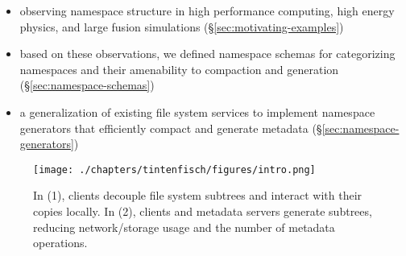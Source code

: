 \begin{itemize}
  \setlength\itemsep{-0.5em}

\item observing namespace structure in high performance computing, high energy
physics, and large fusion simulations (\S\ref{sec:motivating-examples})

\item based on these observations, we defined namespace schemas for
categorizing namespaces and their amenability to compaction and generation
(\S\ref{sec:namespace-schemas})

\item a generalization of existing file system services to implement namespace
generators that efficiently compact and generate metadata
(\S\ref{sec:namespace-generators}) \end{itemize}

\begin{figure}[t]
  \centering
  \texttt{[image: ./chapters/tintenfisch/figures/intro.png]}
  \caption{In (1), clients decouple file system subtrees and interact with
their copies locally. In (2), clients and metadata servers generate subtrees,
reducing network/storage usage and the number of metadata operations.
\label{fig:intro}}
\end{figure}
